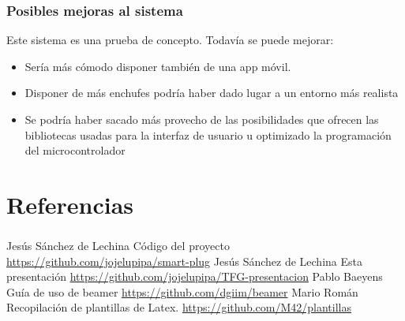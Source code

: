 \documentclass[compress, aspectratio=169]{beamer} %
\begin{document}
\begin{frame}
  \transdissolve[duration=1]
  \frametitle{Posibles mejoras al sistema}

  Este sistema es una prueba de concepto. Todavía se puede mejorar:

  \begin{itemize}
  \item{Sería más cómodo disponer también de una app móvil.}
  \item{Disponer de más enchufes podría haber dado lugar a un entorno
    más realista}
  \item{Se podría haber sacado más provecho de las posibilidades que
    ofrecen las bibliotecas usadas para la interfaz de usuario u
    optimizado la programación del microcontrolador}
  \end{itemize}
\end{frame}

\section{Referencias}

\begin{frame}
  \transdissolve[duration=1]
  \frametitle{\insertsubsection}
  \tableofcontents[currentsection]
\end{frame}

\begin{frame}
  \transdissolve[duration=1]
  
  \frametitle{\insertsection}
    
  \footnotesize{
    \begin{thebibliography}{7} %
     Jesús Sánchez de Lechina
      \newblock Código del proyecto
      \newblock \url{https://github.com/jojelupipa/smart-plug}
     Jesús Sánchez de Lechina
      \newblock Esta presentación
      \newblock \url{https://github.com/jojelupipa/TFG-presentacion}
     Pablo Baeyens
      \newblock Guía de uso de beamer
      \newblock \url{https://github.com/dgiim/beamer}
     Mario Román
      \newblock Recopilación de plantillas de Latex.
      \newblock \url{https://github.com/M42/plantillas}
    \end{thebibliography}
  }
\end{frame}
\end{document}

